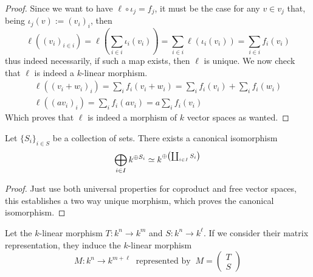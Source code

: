 \begin{proof}
   Since we want to have \(\ell \circ \iota_j = f_j\), it must be the case for
   any \(v \in v_j\) that, being \(\iota_j(v) := (v_i)_i\), then
   \[
      \ell((v_i)_{i \in i}) = \ell \left( \sum_{i \in i} \iota_i(v_i) \right) =
      \sum_{i \in i} \ell(\iota_i(v_i)) = \sum_{i \in i} f_i(v_i)
   \]
   thus indeed necessarily, if such a map exists, then \(\ell\) is unique. We
   now check that \(\ell\) is indeed a \(k\)-linear morphism.
   \begin{gather*}
     \ell\left( (v_i + w_i)_i \right) = \sum_i f_i(v_i + w_i) = \sum_i f_i(v_i)
     + \sum_i  f_i(w_i) \\
     \ell((av_i)_i) = \sum_i f_i(av_i) = a \sum_i f_i(v_i)
   \end{gather*}
   Which proves that \(\ell\) is indeed a morphism of \(k\) vector spaces as
   wanted.
\end{proof}

\begin{proposition}
  Let \(\{S_i\}_{i \in S}\) be a collection of sets. There exists a canonical
  isomorphism
  \[
    \bigoplus_{i \in I} k^{\oplus S_i} \simeq k^{\oplus \left( \coprod_{i \in I}
    S_i \right)}
  \]
\end{proposition}

\begin{proof}
   Just use both universal properties for coproduct and free vector spaces, this
   establishes a two way unique morphism, which proves the canonical
   isomorphism.
\end{proof}

\begin{proposition}
   Let the \(k\)-linear morphism \(T : k^n \to k^m\) and \(S:k^n \to k^\ell\).
   If we consider their matrix representation, they induce the \(k\)-linear
   morphism
   \[
     M : k^n \to k^{m+\ell}\ \text{ represented by }\
     M = \begin{pmatrix} T \\ S \end{pmatrix}
   \]
\end{proposition}

